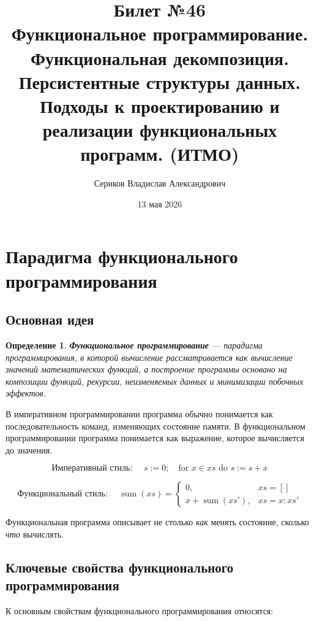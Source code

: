 \documentclass[12pt,a4paper]{article}
\title{Билет №46 \\ \small Функциональное программирование. Функциональная декомпозиция. Персистентные структуры данных. Подходы к проектированию и реализации функциональных программ. (ИТМО)}
\author{Сериков Владислав Александрович}
\date{13 мая 2026}
\newtheorem{definition}{Определение}
\begin{document}
\maketitle
\tableofcontents
\newpage

\section{Парадигма функционального программирования}

\subsection{Основная идея}

\begin{definition}
\textbf{Функциональное программирование} --- парадигма программирования, в которой вычисление рассматривается как вычисление значений математических функций, а построение программы основано на композиции функций, рекурсии, неизменяемых данных и минимизации побочных эффектов.
\end{definition}

В императивном программировании программа обычно понимается как последовательность команд, изменяющих состояние памяти. В функциональном программировании программа понимается как выражение, которое вычисляется до значения.

\[
\text{Императивный стиль: } \quad
s := 0;\quad
\text{for } x \in xs \text{ do } s := s + x
\]

\[
\text{Функциональный стиль: } \quad
\operatorname{sum}(xs) =
\begin{cases}
0, & xs = [] \\
x + \operatorname{sum}(xs'), & xs = x : xs'
\end{cases}
\]

Функциональная программа описывает не столько \emph{как} менять состояние, сколько \emph{что} вычислять.

\subsection{Ключевые свойства функционального программирования}

К основным свойствам функционального программирования относятся:
\end{document}
